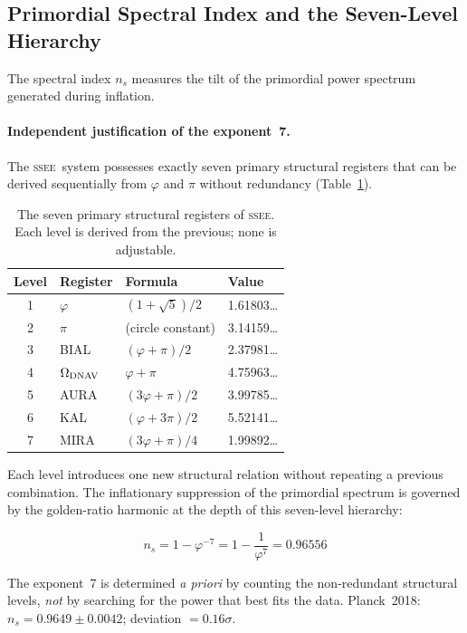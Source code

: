 \documentclass[12pt,a4paper]{article}
\newcommand{\SSEE}{\ifmmode\mathrm{SSEE}\else\textsc{ssee}\fi}
\begin{document}
\subsection{Primordial Spectral Index and the Seven-Level Hierarchy}
\label{sec:ns}

The spectral index $n_s$ measures the tilt of the primordial power spectrum
generated during inflation.

\paragraph{Independent justification of the exponent~7.}
The \SSEE\ system possesses exactly seven primary structural registers that
can be derived sequentially from $\varphi$ and $\pi$ without redundancy
(Table~\ref{tab:hierarchy}).

\begin{table}[ht]
\centering
\caption{The seven primary structural registers of \SSEE.
Each level is derived from the previous; none is adjustable.}
\label{tab:hierarchy}
\begin{tabular}{clll}
\toprule
Level & Register & Formula & Value \\
\midrule
1 & $\varphi$ & $(1+\sqrt5)/2$ & 1.61803\ldots \\
2 & $\pi$     & (circle constant) & 3.14159\ldots \\
3 & BIAL      & $(\varphi+\pi)/2$         & 2.37981\ldots \\
4 & $\Omega_{\rm DNAV}$ & $\varphi+\pi$ & 4.75963\ldots \\
5 & AURA      & $(3\varphi+\pi)/2$         & 3.99785\ldots \\
6 & KAL       & $(\varphi+3\pi)/2$         & 5.52141\ldots \\
7 & MIRA      & $(3\varphi+\pi)/4$         & 1.99892\ldots \\
\bottomrule
\end{tabular}
\end{table}

Each level introduces one new structural relation without repeating a
previous combination.
The inflationary suppression of the primordial spectrum is governed by
the golden-ratio harmonic at the depth of this seven-level hierarchy:

\begin{equation}
\boxed{n_s = 1 - \varphi^{-7} = 1 - \frac{1}{\varphi^7} = 0.96556}
\label{eq:ns}
\end{equation}

The exponent~7 is determined \emph{a priori} by counting the non-redundant
structural levels, \emph{not} by searching for the power that best fits
the data.
Planck~2018: $n_s = 0.9649\pm0.0042$; deviation $= 0.16\sigma$.
\end{document}

